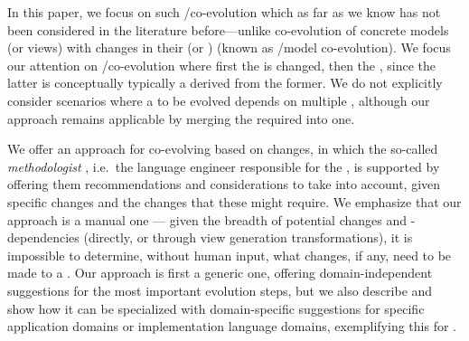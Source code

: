 In this paper, we focus on such \metamodel/\viewtype co-evolution which as far as we know has not been considered in the literature before---unlike co-evolution of concrete models (or views) with changes in their \metamodel (or \viewtype)
(known as \metamodel/model co-evolution).
We focus our attention on \metamodel/\viewtype co-evolution where first the \metamodel is changed, then the \viewtype, since the latter is conceptually typically a \metamodel derived from the former. %
We do not explicitly consider scenarios where a \viewtype to be evolved depends on multiple \metamodels, although our approach remains applicable by merging the required \metamodels into one. %

We offer an approach for co-evolving \viewtypes based on \metamodel changes, in which the so-called \textit{methodologist} \cite{atkinson_orthographic_2010}, i.e.~the language engineer responsible for the \viewtype, is supported by offering them recommendations and considerations to take into account, given specific \metamodel changes and the \viewtype changes that these might require. We emphasize that our approach is a manual one --- given the breadth of potential \metamodel changes and \viewtypes-\metamodel dependencies (directly, or through view generation transformations), it is impossible to determine, without human input, what changes, if any, need to be made to a \viewtype.
Our approach is first a generic one, offering domain-independent suggestions for the most important \metamodel evolution steps, but we also describe and show how it can be specialized with domain-specific suggestions for specific application domains or implementation language domains, exemplifying  this for .

